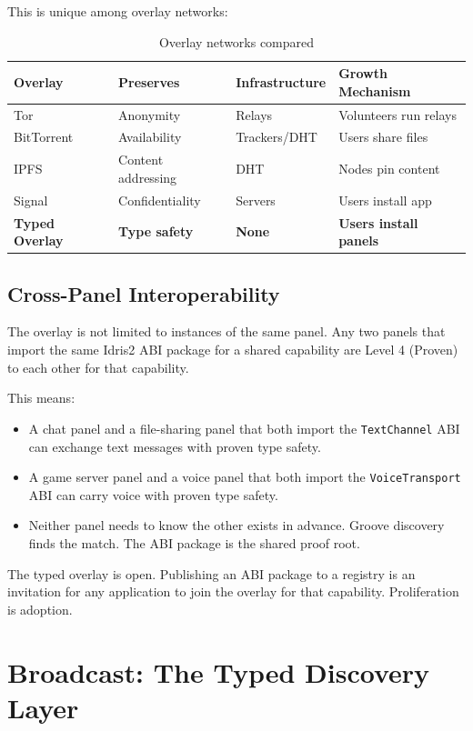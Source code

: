\documentclass[11pt,a4paper]{article}
\begin{document}
This is unique among overlay networks:

\begin{table}[h]
\centering
\small
\begin{tabular}{llll}
\toprule
Overlay & Preserves & Infrastructure & Growth Mechanism \\
\midrule
Tor & Anonymity & Relays & Volunteers run relays \\
BitTorrent & Availability & Trackers/DHT & Users share files \\
IPFS & Content addressing & DHT & Nodes pin content \\
Signal & Confidentiality & Servers & Users install app \\
\textbf{Typed Overlay} & \textbf{Type safety} & \textbf{None}
  & \textbf{Users install panels} \\
\bottomrule
\end{tabular}
\caption{Overlay networks compared}
\end{table}

\subsection{Cross-Panel Interoperability}

The overlay is not limited to instances of the same panel. Any two
panels that import the same Idris2 ABI package for a shared capability
are Level 4 (Proven) to each other for that capability.

This means:
\begin{itemize}
\item A chat panel and a file-sharing panel that both import the
  \texttt{TextChannel} ABI can exchange text messages with proven
  type safety.
\item A game server panel and a voice panel that both import the
  \texttt{VoiceTransport} ABI can carry voice with proven type safety.
\item Neither panel needs to know the other exists in advance. Groove
  discovery finds the match. The ABI package is the shared proof root.
\end{itemize}

The typed overlay is open. Publishing an ABI package to a registry
is an invitation for any application to join the overlay for that
capability. Proliferation is adoption.

\section{Broadcast: The Typed Discovery Layer}
\end{document}
